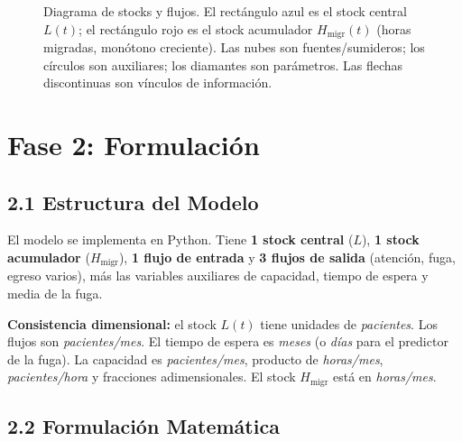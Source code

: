 \documentclass[12pt,a4paper]{article}
\begin{document}
\begin{figure}[H]
\caption{Diagrama de stocks y flujos. El rectángulo azul es el stock central $L(t)$;
  el rectángulo rojo es el stock acumulador $H_{\text{migr}}(t)$ (horas migradas,
  monótono creciente). Las nubes son fuentes/sumideros; los círculos son auxiliares;
  los diamantes son parámetros. Las flechas discontinuas son vínculos de información.}
\label{fig:stocks}
\end{figure}

\section*{Fase 2: Formulación}

\subsection*{2.1 Estructura del Modelo}

El modelo se implementa en Python. Tiene \textbf{1 stock central} ($L$), \textbf{1 stock acumulador} ($H_{\text{migr}}$), \textbf{1 flujo de entrada} y \textbf{3 flujos de salida} (atención, fuga, egreso varios), más las variables auxiliares de capacidad, tiempo de espera y media de la fuga.

\begin{definicion}
\textbf{Consistencia dimensional:} el stock $L(t)$ tiene unidades de \textit{pacientes}. Los flujos son \textit{pacientes/mes}. El tiempo de espera es \textit{meses} (o \textit{días} para el predictor de la fuga). La capacidad es \textit{pacientes/mes}, producto de \textit{horas/mes}, \textit{pacientes/hora} y fracciones adimensionales. El stock $H_{\text{migr}}$ está en \textit{horas/mes}.
\end{definicion}

\subsection*{2.2 Formulación Matemática}
\end{document}
